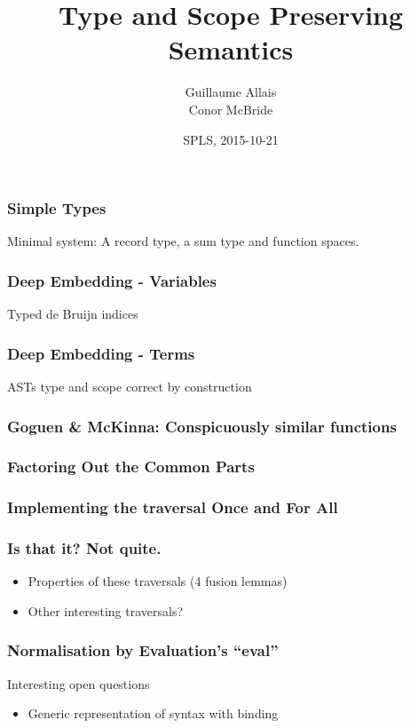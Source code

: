 \documentclass[xetex, mathserif, serif]{beamer}
\title{Type and Scope Preserving Semantics}
\author[me]{Guillaume Allais\\[3mm]Conor McBride}
\institute{University of Strathclyde}
\date{SPLS, 2015-10-21}
\begin{document}
 
  \begin{frame}
    \titlepage
  \end{frame}

  \begin{frame}\frametitle{Simple Types}
    Minimal system: A record type, a sum type and function spaces.

  \end{frame}

  \begin{frame}\frametitle{Deep Embedding - Variables}
    Typed de Bruijn indices

  \end{frame}
  \begin{frame}\frametitle{Deep Embedding - Terms}
    ASTs type and scope correct by construction

  \end{frame}

  \begin{frame}\frametitle{Goguen \& McKinna: Conspicuously similar functions}
  \end{frame}

  \begin{frame}\frametitle{Factoring Out the Common Parts}
  \end{frame}

  \begin{frame}\frametitle{Implementing the traversal Once and For All}
  \end{frame}

  \begin{frame}\frametitle{Is that it? Not quite.}
    \begin{itemize}
      \item Properties of these traversals (4 fusion lemmas)
      \item Other interesting traversals?
    \end{itemize}
  \end{frame}

  \begin{frame}\frametitle{Normalisation by Evaluation's ``eval''}
  \end{frame}

  \begin{frame}{Interesting open questions}
    \begin{itemize}
      \item Generic representation of syntax with binding
    \end{itemize}
  \end{frame}
\end{document}

